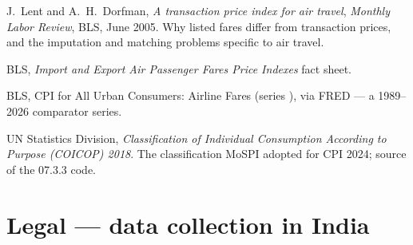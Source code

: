 \begin{enumerate}[label={[\arabic*]},start=18]
\item J.\ Lent and A.\ H.\ Dorfman, \emph{A transaction price index for air travel},
\emph{Monthly Labor Review}, BLS, June 2005. Why listed fares differ from transaction prices,
and the imputation and matching problems specific to air travel.\\

\item BLS, \emph{Import and Export Air Passenger Fares Price Indexes} fact sheet.\\

\item BLS, CPI for All Urban Consumers: Airline Fares (series ), via
FRED --- a 1989--2026 comparator series.\\

\item UN Statistics Division, \emph{Classification of Individual Consumption According to
Purpose (COICOP) 2018}. The classification MoSPI adopted for CPI 2024; source of the 07.3.3
code.
\end{enumerate}

\section{Legal --- data collection in India}

